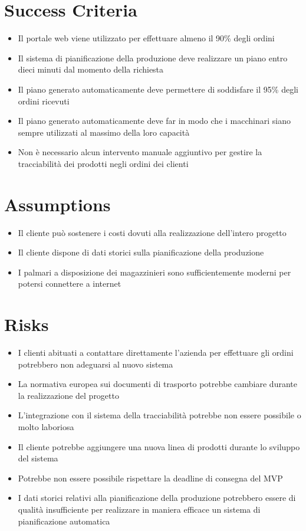 \section{Success Criteria}
\begin{itemize}
  \item Il portale web viene utilizzato per effettuare almeno il 90\% degli ordini
  \item Il sistema di pianificazione della produzione deve realizzare un piano entro dieci minuti dal momento della richiesta
  \item Il piano generato automaticamente deve permettere di soddisfare il 95\% degli ordini ricevuti
  \item Il piano generato automaticamente deve far in modo che i macchinari siano sempre utilizzati al massimo della loro capacità
  \item Non è necessario alcun intervento manuale aggiuntivo per gestire la tracciabilità dei prodotti negli ordini dei clienti
\end{itemize}

\section{Assumptions}
\begin{itemize}
  \item Il cliente può sostenere i costi dovuti alla realizzazione dell'intero progetto
  \item Il cliente dispone di dati storici sulla pianificazione della produzione
  \item I palmari a disposizione dei magazzinieri sono sufficientemente moderni per potersi connettere a internet
\end{itemize}

\section{Risks}
\begin{itemize}
  \item I clienti abituati a contattare direttamente l'azienda per effettuare gli ordini potrebbero non adeguarsi al nuovo sistema
  \item La normativa europea sui documenti di trasporto potrebbe cambiare durante la realizzazione del progetto
  \item L'integrazione con il sistema della tracciabilità potrebbe non essere possibile o molto laboriosa
  \item Il cliente potrebbe aggiungere una nuova linea di prodotti durante lo sviluppo del sistema
  \item Potrebbe non essere possibile rispettare la deadline di consegna del MVP
  \item I dati storici relativi alla pianificazione della produzione potrebbero essere di qualità insufficiente per realizzare in maniera efficace un sistema di pianificazione automatica
\end{itemize}

